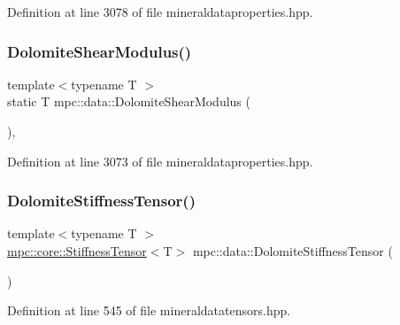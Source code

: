 Definition at line 3078 of file mineraldataproperties.\+hpp.

\mbox{\label{namespacempc_1_1data_afb6ba286047642b150496abbc23f58dd}} 
\subsubsection{\texorpdfstring{Dolomite\+Shear\+Modulus()}{DolomiteShearModulus()}}
{\footnotesize\ttfamily template$<$typename T $>$ \\
static T mpc\+::data\+::\+Dolomite\+Shear\+Modulus (\begin{DoxyParamCaption}{ }\end{DoxyParamCaption})\hspace{0.3cm}{\ttfamily [inline]}, {\ttfamily [static]}}



Definition at line 3073 of file mineraldataproperties.\+hpp.

\mbox{\label{namespacempc_1_1data_a466031147c2c396d06aee19a9677fc84}} 
\subsubsection{\texorpdfstring{Dolomite\+Stiffness\+Tensor()}{DolomiteStiffnessTensor()}}
{\footnotesize\ttfamily template$<$typename T $>$ \\
\mbox{\hyperlink{structmpc_1_1core_1_1_stiffness_tensor}{mpc\+::core\+::\+Stiffness\+Tensor}}$<$T$>$ mpc\+::data\+::\+Dolomite\+Stiffness\+Tensor (\begin{DoxyParamCaption}{ }\end{DoxyParamCaption})}



Definition at line 545 of file mineraldatatensors.\+hpp.

\mbox{\label{namespacempc_1_1data_ac3b4fa976ac3ee6d65fa75caeab84383}} 
